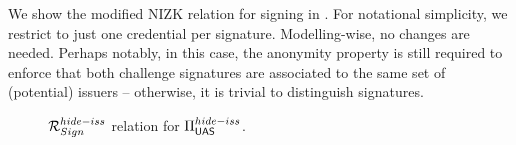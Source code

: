 We show the modified NIZK relation for signing in . For
notational simplicity, we restrict to just one credential per signature.
%
Modelling-wise, no changes are needed. Perhaps notably, in this case, the
anonymity property is still required to enforce that both challenge signatures
are associated to the same set of (potential) issuers -- otherwise, it is
trivial to distinguish signatures.

\begin{figure}[ht!]
  \scalebox{0.9}{
    
  }
  \caption{$\mathcal{R}^{hide-iss}_{Sign}$ relation for $\Pi_{\mathsf{UAS}}^{hide-iss}$.}
  \label{fig:nizk-ring}
\end{figure}

